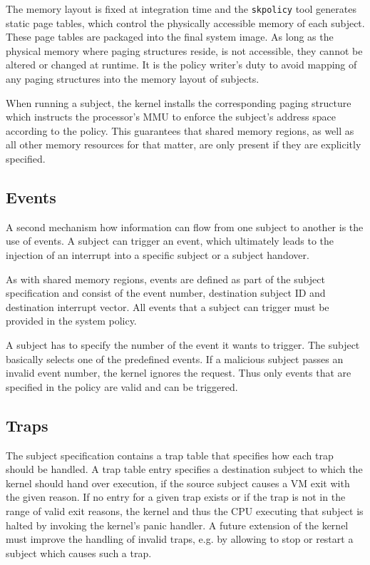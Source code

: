 The memory layout is fixed at integration time and the \texttt{skpolicy} tool
generates static page tables, which control the physically accessible memory of
each subject. These page tables are packaged into the final system image. As
long as the physical memory where paging structures reside, is not accessible,
they cannot be altered or changed at runtime. It is the policy writer's duty to
avoid mapping of any paging structures into the memory layout of subjects.

When running a subject, the kernel installs the corresponding paging structure
which instructs the processor's MMU to enforce the subject's address space
according to the policy. This guarantees that shared memory regions, as well as
all other memory resources for that matter, are only present if they are
explicitly specified.

\subsection{Events}
A second mechanism how information can flow from one subject to another is the
use of events. A subject can trigger an event, which ultimately leads to the
injection of an interrupt into a specific subject or a subject handover.

As with shared memory regions, events are defined as part of the subject
specification and consist of the event number, destination subject ID and
destination interrupt vector. All events that a subject can trigger must be
provided in the system policy.

A subject has to specify the number of the event it wants to trigger. The
subject basically selects one of the predefined events. If a malicious subject
passes an invalid event number, the kernel ignores the request. Thus only events
that are specified in the policy are valid and can be triggered.

\subsection{Traps}
The subject specification contains a trap table that specifies how each trap
should be handled. A trap table entry specifies a destination subject to which
the kernel should hand over execution, if the source subject causes a VM exit
with the given reason. If no entry for a given trap exists or if the trap is not
in the range of valid exit reasons, the kernel and thus the CPU executing that
subject is halted by invoking the kernel's panic handler. A future extension of
the kernel must improve the handling of invalid traps, e.g. by allowing to
stop or restart a subject which causes such a trap.

